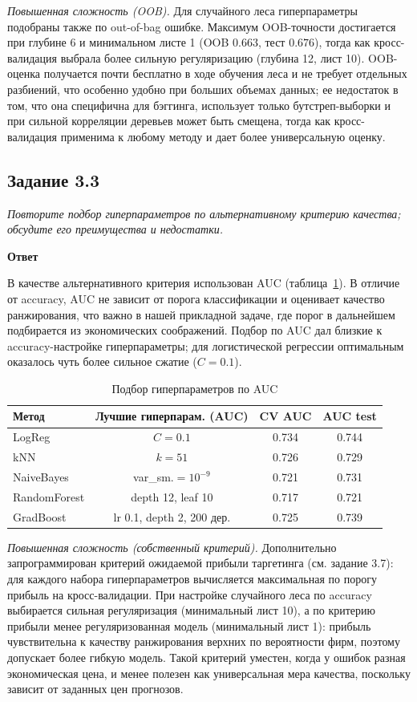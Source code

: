 \documentclass[12pt,a4paper]{article}
\newcommand{\zadanie}[2]{\subsection*{Задание #1}\begingroup\itshape #2\par\endgroup\medskip}
\newcommand{\otvet}{\par\noindent\textbf{Ответ}\par\medskip}
\begin{document}
\textit{Повышенная сложность (OOB).} Для случайного леса гиперпараметры подобраны также по out-of-bag ошибке. Максимум OOB-точности достигается при глубине 6 и минимальном листе 1 (OOB $0.663$, тест $0.676$), тогда как кросс-валидация выбрала более сильную регуляризацию (глубина 12, лист 10). OOB-оценка получается почти бесплатно в ходе обучения леса и не требует отдельных разбиений, что особенно удобно при больших объемах данных; ее недостаток в том, что она специфична для бэггинга, использует только бутстреп-выборки и при сильной корреляции деревьев может быть смещена, тогда как кросс-валидация применима к любому методу и дает более универсальную оценку.

\zadanie{3.3}{Повторите подбор гиперпараметров по альтернативному критерию качества; обсудите его преимущества и недостатки.}
\otvet
В качестве альтернативного критерия использован AUC (таблица~\ref{tab:clf_auc_tuning}). В отличие от accuracy, AUC не зависит от порога классификации и оценивает качество ранжирования, что важно в нашей прикладной задаче, где порог в дальнейшем подбирается из экономических соображений. Подбор по AUC дал близкие к accuracy-настройке гиперпараметры; для логистической регрессии оптимальным оказалось чуть более сильное сжатие ($C=0.1$).

\begin{table}[H]\centering\small
\caption{Подбор гиперпараметров по AUC}\label{tab:clf_auc_tuning}
\begin{tabular}{lccc}\toprule
Метод & Лучшие гиперпарам. (AUC) & CV AUC & AUC test\\\midrule
LogReg & $C=0.1$ & 0.734 & 0.744\\
kNN & $k=51$ & 0.726 & 0.729\\
NaiveBayes & var\_sm.$=10^{-9}$ & 0.721 & 0.731\\
RandomForest & depth 12, leaf 10 & 0.717 & 0.721\\
GradBoost & lr 0.1, depth 2, 200 дер. & 0.725 & 0.739\\\bottomrule
\end{tabular}
\end{table}

\textit{Повышенная сложность (собственный критерий).} Дополнительно запрограммирован критерий ожидаемой прибыли таргетинга (см. задание 3.7): для каждого набора гиперпараметров вычисляется максимальная по порогу прибыль на кросс-валидации. При настройке случайного леса по accuracy выбирается сильная регуляризация (минимальный лист 10), а по критерию прибыли менее регуляризованная модель (минимальный лист 1): прибыль чувствительна к качеству ранжирования верхних по вероятности фирм, поэтому допускает более гибкую модель. Такой критерий уместен, когда у ошибок разная экономическая цена, и менее полезен как универсальная мера качества, поскольку зависит от заданных цен прогнозов.
\end{document}
